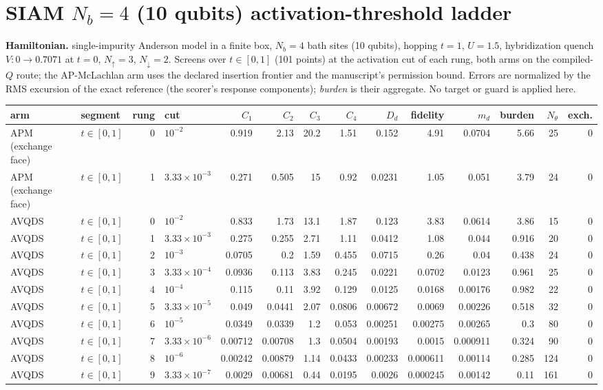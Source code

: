 \documentclass[10pt]{article}
\begin{document}
\section*{SIAM $N_b=4$ (10 qubits) activation-threshold ladder}
\textbf{Hamiltonian.} single-impurity Anderson model in a finite box, $N_b=4$ bath sites (10 qubits), hopping $t=1$, $U=1.5$, hybridization quench $V: 0\to0.7071$ at $t=0$, $N_\uparrow=3$, $N_\downarrow=2$.
Screens over $t\in[0,1]$ (101 points) at the activation cut of each rung, both arms on the compiled-$Q$ route; the AP-McLachlan arm uses the declared insertion frontier and the manuscript's permission bound.  Errors are normalized by the RMS excursion of the exact reference (the scorer's response components); \emph{burden} is their aggregate.  No target or guard is applied here.
\begin{table}[H]\centering\scriptsize\setlength{\tabcolsep}{3.5pt}\begin{tabular}{llrlrrrrrrrrrr}\toprule
arm & segment & rung & cut & $C_{1}$ & $C_{2}$ & $C_{3}$ & $C_{4}$ & $D_{d}$ & fidelity & $m_{d}$ & burden & $N_\theta$ & exch. \\ \midrule
APM (exchange face) & $t\in[0,1]$ & 0 & $10^{-2}$ & 0.919 & 2.13 & 20.2 & 1.51 & 0.152 & 4.91 & 0.0704 & 5.66 & 25 & 0 \\
APM (exchange face) & $t\in[0,1]$ & 1 & $3.33\times10^{-3}$ & 0.271 & 0.505 & 15 & 0.92 & 0.0231 & 1.05 & 0.051 & 3.79 & 24 & 0 \\
AVQDS & $t\in[0,1]$ & 0 & $10^{-2}$ & 0.833 & 1.73 & 13.1 & 1.87 & 0.123 & 3.83 & 0.0614 & 3.86 & 15 & 0 \\
AVQDS & $t\in[0,1]$ & 1 & $3.33\times10^{-3}$ & 0.275 & 0.255 & 2.71 & 1.11 & 0.0412 & 1.08 & 0.044 & 0.916 & 20 & 0 \\
AVQDS & $t\in[0,1]$ & 2 & $10^{-3}$ & 0.0705 & 0.2 & 1.59 & 0.455 & 0.0715 & 0.26 & 0.04 & 0.438 & 24 & 0 \\
AVQDS & $t\in[0,1]$ & 3 & $3.33\times10^{-4}$ & 0.0936 & 0.113 & 3.83 & 0.245 & 0.0221 & 0.0702 & 0.0123 & 0.961 & 25 & 0 \\
AVQDS & $t\in[0,1]$ & 4 & $10^{-4}$ & 0.115 & 0.11 & 3.92 & 0.129 & 0.0125 & 0.0168 & 0.00176 & 0.982 & 22 & 0 \\
AVQDS & $t\in[0,1]$ & 5 & $3.33\times10^{-5}$ & 0.049 & 0.0441 & 2.07 & 0.0806 & 0.00672 & 0.0069 & 0.00226 & 0.518 & 32 & 0 \\
AVQDS & $t\in[0,1]$ & 6 & $10^{-5}$ & 0.0349 & 0.0339 & 1.2 & 0.053 & 0.00251 & 0.00275 & 0.00265 & 0.3 & 80 & 0 \\
AVQDS & $t\in[0,1]$ & 7 & $3.33\times10^{-6}$ & 0.00712 & 0.00708 & 1.3 & 0.0504 & 0.00193 & 0.0015 & 0.000911 & 0.324 & 90 & 0 \\
AVQDS & $t\in[0,1]$ & 8 & $10^{-6}$ & 0.00242 & 0.00879 & 1.14 & 0.0433 & 0.00233 & 0.000611 & 0.00114 & 0.285 & 124 & 0 \\
AVQDS & $t\in[0,1]$ & 9 & $3.33\times10^{-7}$ & 0.0029 & 0.00681 & 0.44 & 0.0195 & 0.0026 & 0.000245 & 0.00142 & 0.11 & 161 & 0 \\
\bottomrule\end{tabular}\end{table}
\end{document}
